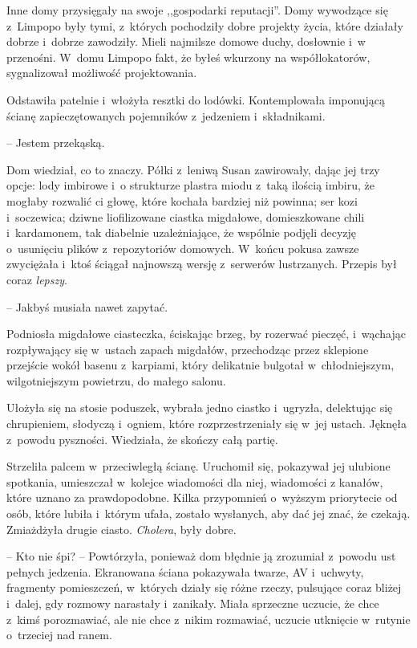 \documentclass[oneside,polish,11pt,sfheadings]{mwbk}
\begin{document}
Inne domy przysięgały na swoje ,,gospodarki reputacji''. Domy wywodzące
się z~Limpopo były tymi, z~których pochodziły dobre projekty życia,
które działały dobrze i~dobrze zawodziły. Mieli najmilsze domowe duchy,
dosłownie i~w przenośni. W~domu Limpopo fakt, że byłeś wkurzony na
współlokatorów, sygnalizował możliwość projektowania.

Odstawiła patelnie i~włożyła resztki do lodówki. Kontemplowała
imponującą ścianę zapieczętowanych pojemników z~jedzeniem i~składnikami.

-- Jestem przekąską.

Dom wiedział, co to znaczy. Półki z~leniwą Susan zawirowały, dając jej
trzy opcje: lody imbirowe i~o strukturze plastra miodu z~taką ilością
imbiru, że mogłaby rozwalić ci głowę, które kochała bardziej niż
powinna; ser kozi i~soczewica; dziwne liofilizowane ciastka migdałowe,
domieszkowane chili i~kardamonem, tak diabelnie uzależniające, że
wspólnie podjęli decyzję o~usunięciu plików z~repozytoriów domowych. W~końcu pokusa zawsze zwyciężała i~ktoś ściągał najnowszą wersję z~serwerów lustrzanych. Przepis był coraz \textit{lepszy}.

-- Jakbyś musiała nawet zapytać. 

 Podniosła migdałowe ciasteczka,
ściskając brzeg, by rozerwać pieczęć, i~wąchając rozpływający się w~ustach zapach migdałów, przechodząc przez sklepione przejście wokół
basenu z~karpiami, który delikatnie bulgotał w~chłodniejszym,
wilgotniejszym powietrzu, do małego salonu.

Ułożyła się na stosie poduszek, wybrała jedno ciastko i~ugryzła,
delektując się chrupieniem, słodyczą i~ogniem, które rozprzestrzeniały
się w~jej ustach. Jęknęła z~powodu pyszności. Wiedziała, że skończy całą
partię.

Strzeliła palcem w~przeciwległą ścianę. Uruchomił się, pokazywał jej
ulubione spotkania, umieszczał w~kolejce wiadomości dla niej, wiadomości
z kanałów, które uznano za prawdopodobne. Kilka przypomnień o~wyższym
priorytecie od osób, które lubiła i~którym ufała, zostało wysłanych, aby
dać jej znać, że czekają. Zmiażdżyła drugie ciasto. \textit{Cholera}, były
dobre.

-- Kto nie śpi? -- Powtórzyła, ponieważ dom błędnie ją zrozumiał z~powodu
ust pełnych jedzenia. Ekranowana ściana pokazywała twarze, AV i~uchwyty,
fragmenty pomieszczeń, w~których działy się różne rzeczy, pulsujące
coraz bliżej i~dalej, gdy rozmowy narastały i~zanikały. Miała sprzeczne
uczucie, że chce z~kimś porozmawiać, ale nie chce z~nikim rozmawiać,
uczucie utknięcie w~rutynie o~trzeciej nad ranem.
\end{document}
